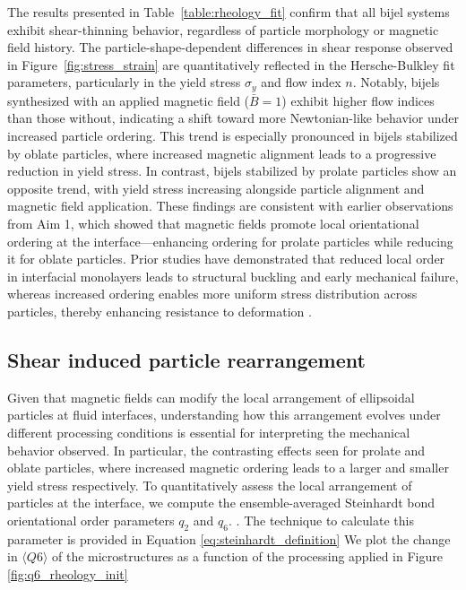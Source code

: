 The results presented in Table~\ref{table:rheology_fit} confirm that all bijel systems exhibit shear-thinning behavior, regardless of particle morphology or 
magnetic field history. The particle-shape-dependent differences in shear response observed in Figure~\ref{fig:stress_strain} are quantitatively reflected in 
the Hersche-Bulkley fit parameters, particularly in the yield stress $\sigma_y$ and flow index $n$. Notably, bijels synthesized with an applied magnetic field 
($\bar{B} = 1$) exhibit higher flow indices than those without, indicating a shift toward more Newtonian-like behavior under increased particle ordering. This 
trend is especially pronounced in bijels stabilized by oblate particles, where increased magnetic alignment leads to a progressive reduction in yield stress. 
In contrast, bijels stabilized by prolate particles show an opposite trend, with yield stress increasing alongside particle alignment and magnetic field 
application. These findings are consistent with earlier observations from Aim 1, which showed that magnetic fields promote local orientational ordering at the 
interface—enhancing ordering for prolate particles while reducing it for oblate particles. Prior studies have demonstrated that reduced local order in 
interfacial monolayers leads to structural buckling and early mechanical failure, whereas increased ordering enables more uniform stress distribution 
across particles, thereby enhancing resistance to deformation \cite{prakash_buckling_2024}.

\subsection{Shear induced particle rearrangement}

Given that magnetic fields can modify the local arrangement of ellipsoidal particles at fluid interfaces, understanding how this arrangement evolves under 
different processing conditions is essential for interpreting the mechanical 
behavior observed. In particular, the contrasting effects seen for prolate and oblate particles, where increased magnetic ordering leads to a larger
and smaller yield stress respectively. To quantitatively assess the local arrangement of particles at the interface, we compute the ensemble-averaged 
Steinhardt bond orientational order parameters $q_2$ and $q_6$. 
\cite{steinhardt_bond-orientational_1983, lechner_accurate_2008, mickel_shortcomings_2013}. The technique to calculate this parameter is provided in
Equation \ref{eq:steinhardt_definition} We plot the change in 
$\langle Q6 \rangle$ of the microstructures as a function of the processing applied in Figure \ref{fig:q6_rheology_init}

